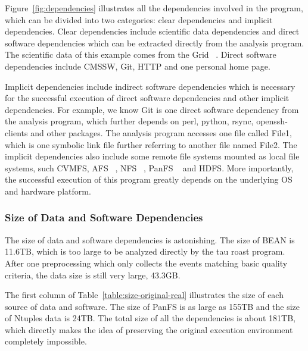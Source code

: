 \documentclass{acm_proc_article-sp}
\begin{document}
Figure~\ref{fig:dependencies} illustrates all the dependencies
involved in the program, which can be divided into two categories: clear
dependencies and implicit dependencies. Clear dependencies include scientific data
dependencies and direct software dependencies which can be extracted directly
from the analysis program. The scientific data of this example comes from the Grid ~\cite{holtman2001cms}. Direct software dependencies include CMSSW, Git, HTTP and one personal home page. 

Implicit dependencies include indirect software
dependencies which is necessary for the successful execution of direct software
dependencies and other implicit dependencies. For example, we know Git is one
direct software dependency from the analysis program, which further depends on
perl, python, rsync, openssh-clients and other packages. The analysis program
accesses one file called File1, which is one symbolic link file further referring to
another file named File2.
The implicit dependencies also include some remote file systems mounted as local file systems, such CVMFS, AFS ~\cite{howard1988scale}, NFS ~\cite{sandberg1985design}, PanFS ~\cite{welch2008scalable} and HDFS.
More importantly, the successful execution of this program greatly depends on the underlying OS and hardware platform.

\subsubsection{Size of Data and Software Dependencies}
The size of data and software dependencies is astonishing.
The size of BEAN is 11.6TB, which is too large to be analyzed directly by the tau roast program. After one preprocessing which only collects the events matching basic quality criteria, the data size is still very large, 43.3GB. 

The first column of Table~\ref{table:size-original-real} illustrates the size of each source of data and software. The size of PanFS is as large as 155TB and the size of Ntuples data is 24TB. The total size of all the dependencies is about 181TB, which directly makes the idea of preserving the original execution environment completely impossible.
\end{document}
